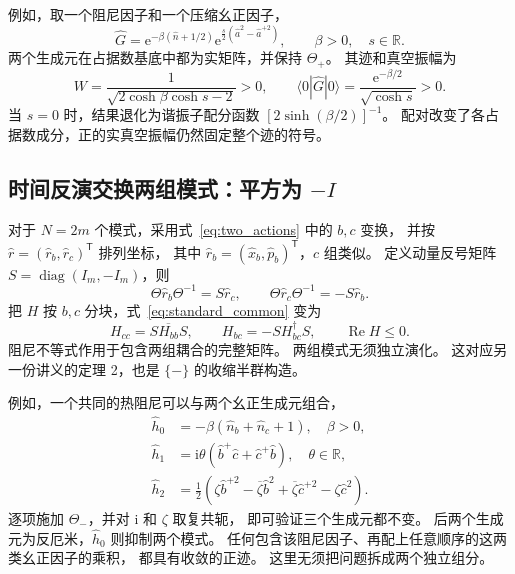 \documentclass[UTF8,11pt,a4paper,fontset=fandol]{ctexart}
\newcommand{\diag}{\operatorname{diag}}
\newcommand{\ee}{\mathrm e}
\newcommand{\ii}{\mathrm i}
\newcommand{\trans}{\mathsf T}
\numberwithin{equation}{section}
\begin{document}
例如，取一个阻尼因子和一个压缩幺正因子，
\begin{equation}
 \hat G=\ee^{-\beta(\hat n+1/2)}
 \ee^{\frac{s}{2}(\hat a^2-\hat a^{+2})},
 \qquad \beta>0,\quad s\in\mathbb R.
 \label{eq:plus_example}
\end{equation}
两个生成元在占据数基底中都为实矩阵，并保持 $\Theta_+$。
其迹和真空振幅为
\begin{equation}
 W=\frac{1}{\sqrt{2\cosh\beta\cosh s-2}}>0,
 \qquad
 \langle0|\hat G|0\rangle=
 \frac{\ee^{-\beta/2}}{\sqrt{\cosh s}}>0.
 \label{eq:plus_example_trace}
\end{equation}
当 $s=0$ 时，结果退化为谐振子配分函数
$[2\sinh(\beta/2)]^{-1}$。
配对改变了各占据数成分，正的实真空振幅仍然固定整个迹的符号。

\subsection{时间反演交换两组模式：平方为 \texorpdfstring{$-I$}{-I}}

对于 $N=2m$ 个模式，采用式~\eqref{eq:two_actions} 中的 $b,c$ 变换，
并按 $\hat r=(\hat r_b,\hat r_c)^\trans$ 排列坐标，
其中 $\hat r_b=(\hat x_b,\hat p_b)^\trans$，$c$ 组类似。
定义动量反号矩阵 $S=\diag(I_m,-I_m)$，则
\begin{equation}
 \Theta\hat r_b\Theta^{-1}=S\hat r_c,\qquad
 \Theta\hat r_c\Theta^{-1}=-S\hat r_b.
\end{equation}
把 $H$ 按 $b,c$ 分块，式~\eqref{eq:standard_common} 变为
\begin{equation}
 \boxed{H_{cc}=S\overline{H_{bb}}S,\qquad
 H_{bc}=-S H_{bc}^\dagger S,\qquad
 \operatorname{Re}H\leq0.}
 \label{eq:minus_standard}
\end{equation}
阻尼不等式作用于包含两组耦合的完整矩阵。
两组模式无须独立演化。
这对应另一份讲义的定理 2，也是 $\{-\}$ 的收缩半群构造。

例如，一个共同的热阻尼可以与两个幺正生成元组合，
\begin{align}
 \hat h_0&=-\beta(\hat n_b+\hat n_c+1),\quad\beta>0,\nonumber\\
 \hat h_1&=\ii\theta(\hat b^+\hat c+\hat c^+\hat b),
 \quad\theta\in\mathbb R,\nonumber\\
 \hat h_2&=\frac12\left(
 \zeta\hat b^{+2}-\overline\zeta\hat b^2
 +\overline\zeta\hat c^{+2}-\zeta\hat c^2\right).
 \label{eq:minus_example}
\end{align}
逐项施加 $\Theta_-$，并对 $\ii$ 和 $\zeta$ 取复共轭，
即可验证三个生成元都不变。
后两个生成元为反厄米，$\hat h_0$ 则抑制两个模式。
任何包含该阻尼因子、再配上任意顺序的这两类幺正因子的乘积，
都具有收敛的正迹。
这里无须把问题拆成两个独立组分。
\end{document}
